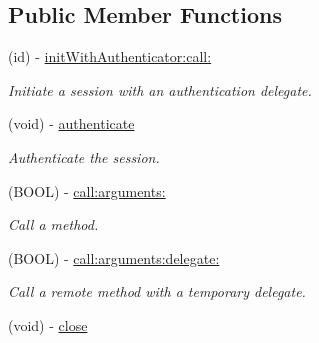 \subsection*{Public Member Functions}
\begin{DoxyCompactItemize}
\item 
(id) -\/ \hyperlink{interface_r_m_session_a17841007deca0854a7926b895f46fa10}{initWithAuthenticator:call:}
\begin{DoxyCompactList}\small\item\em Initiate a session with an authentication delegate. \item\end{DoxyCompactList}\item 
\hypertarget{interface_r_m_session_aba47598cf422661784044b0f24286939}{
(void) -\/ \hyperlink{interface_r_m_session_aba47598cf422661784044b0f24286939}{authenticate}}
\label{interface_r_m_session_aba47598cf422661784044b0f24286939}

\begin{DoxyCompactList}\small\item\em Authenticate the session. \item\end{DoxyCompactList}\item 
(BOOL) -\/ \hyperlink{interface_r_m_session_ad8842825e7ffa3ea841d0f44dc0360ac}{call:arguments:}
\begin{DoxyCompactList}\small\item\em Call a method. \item\end{DoxyCompactList}\item 
(BOOL) -\/ \hyperlink{interface_r_m_session_adaf01c561e55c091d8011dc507a1f1d0}{call:arguments:delegate:}
\begin{DoxyCompactList}\small\item\em Call a remote method with a temporary delegate. \item\end{DoxyCompactList}\item 
\hypertarget{interface_r_m_session_a77c806e25987046026c7bb60accabe1b}{
(void) -\/ \hyperlink{interface_r_m_session_a77c806e25987046026c7bb60accabe1b}{close}}
\label{interface_r_m_session_a77c806e25987046026c7bb60accabe1b}


\end{DoxyCompactItemize}
